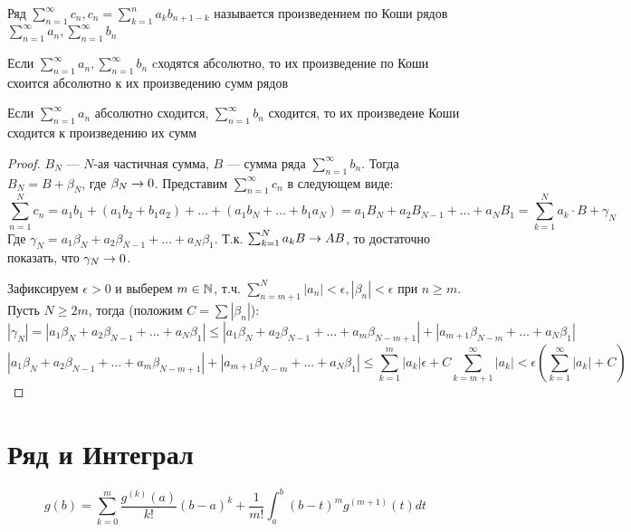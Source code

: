 \begin{definition}
    Ряд \(\sum_{n = 1}^\infty c_n, c_n = \sum_{k = 1}^na_kb_{n + 1 - k}\) называется произведением по Коши рядов \(\sum_{n = 1}^\infty a_n, \sum_{n = 1}^\infty b_n\)
\end{definition}

\begin{corollary}
    Если \(\sum_{n = 1}^\infty a_n, \sum_{n = 1}^\infty b_n\) cходятся абсолютно, то их произведение по Коши схоится абсолютно к их произведению сумм рядов
\end{corollary}

\begin{theorem}[Мертенс]
    Если \(\sum_{n = 1}^\infty a_n\) абсолютно сходится, \(\sum_{n = 1}^\infty b_n\) сходится, то их произведеие Коши сходится к произведению их сумм
\end{theorem}
\begin{proof}
    \(B_N\) --- \(N\)-ая частичная сумма, \(B\) --- сумма ряда \(\sum_{n = 1}^\infty b_n\). Тогда \(B_N = B + \beta_N\), где \(\beta_N \rightarrow 0\). Представим \(\sum_{n = 1}^\infty c_n\) в следующем виде:
    \[\sum_{n = 1}^N c_n = a_1b_1 + (a_1b_2 + b_1a_2) + \dots + (a_1b_N + \dots + b_1a_N) = a_1B_N + a_2B_{N - 1} + \dots + a_NB_1 = \sum_{k = 1}^N a_k \cdot B + \gamma_N\]
    Где \(\gamma_N = a_1\beta_N + a_2\beta_{N - 1} + \dots + a_N\beta_1\). Т.к. \(\sum_{k = 1}^N a_kB \rightarrow AB\), то достаточно показать, что \(\gamma_N \rightarrow 0\). 

    Зафиксируем \(\epsilon > 0\) и выберем \(m \in \mathbb{N}\), т.ч. \(\sum_{n = m + 1}^N|a_n| < \epsilon, |\beta_n| < \epsilon\) при \(n \ge m\). Пусть \(N \ge 2m\), тогда (положим \(C = \sum |\beta_n|\)):
    \[|\gamma_N| = |a_1\beta_N + a_2\beta_{N - 1} + \dots + a_N\beta_1| \le |a_1\beta_N + a_2\beta_{N - 1} + \dots + a_m\beta_{N - m + 1}|  + |a_{m + 1}\beta_{N - m} + \dots + a_N\beta_1|\]
    \[|a_1\beta_N + a_2\beta_{N - 1} + \dots + a_m\beta_{N - m + 1}|  + |a_{m + 1}\beta_{N - m} + \dots + a_N\beta_1| \le \sum_{k = 1}^m |a_k|\epsilon + C \sum_{k = m + 1}^\infty |a_k| < \epsilon\left(\sum_{k = 1}^\infty|a_k| + C\right)\]
\end{proof}

\section{Ряд и Интеграл}
\[g(b) = \sum_{k = 0}^m \frac{g^{(k)}(a)}{k!}(b - a)^k + \frac{1}{m!}\int_a^b(b - t)^mg^{(m + 1)}(t)dt\]

